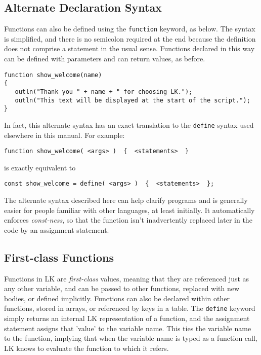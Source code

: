 \documentclass{article}
\begin{document}
\subsection{Alternate Declaration Syntax}

Functions can also be defined using the \texttt{function} keyword, as below.  The syntax is simplified, and there is no semicolon required at the end because the definition does not comprise a statement in the usual sense.  Functions declared in this way can be defined with parameters and can return values, as before.

\begin{verbatim}
function show_welcome(name)
{
   outln("Thank you " + name + " for choosing LK.");
   outln("This text will be displayed at the start of the script.");
}
\end{verbatim}

In fact, this alternate syntax has an exact translation to the \texttt{define} syntax used elsewhere in this manual.  For example:

\begin{verbatim}
function show_welcome( <args> )  {  <statements>  }
\end{verbatim}
is exactly equivalent to
\begin{verbatim}
const show_welcome = define( <args> )  {  <statements>  };
\end{verbatim}

The alternate syntax described here can help clarify programs and is generally easier for people familiar with other languages, at least initially.  It automatically enforces \emph{const-ness}, so that the function isn't inadvertently replaced later in the code by an assignment statement.



\subsection{First-class Functions}

Functions in LK are \emph{first-class} values, meaning that they are referenced just as any other variable, and can be passed to other functions, replaced with new bodies, or defined implicitly.  Functions can also be declared within other functions, stored in arrays, or referenced by keys in a table.  The \texttt{define} keyword simply returns an internal LK representation of a function, and the assignment statement assigns that 'value' to the variable name.  This ties the variable name to the function, implying that when the variable name is typed as a function call, LK knows to evaluate the function to which it refers.
\end{document}
